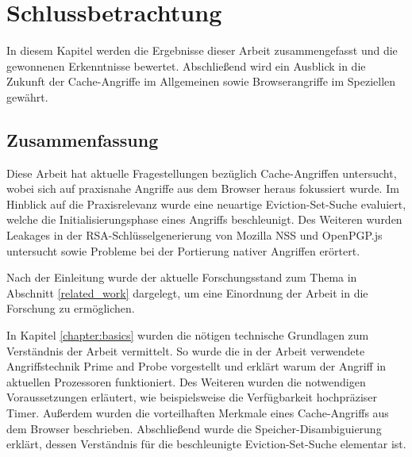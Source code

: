 \chapter{Schlussbetrachtung}
\label{chapter:conclusions}

In diesem Kapitel werden die Ergebnisse dieser Arbeit zusammengefasst und die gewonnenen Erkenntnisse bewertet.
Abschließend wird ein Ausblick in die Zukunft der Cache-Angriffe im Allgemeinen sowie Browserangriffe im Speziellen gewährt.

\section{Zusammenfassung}

Diese Arbeit hat aktuelle Fragestellungen bezüglich Cache-Angriffen untersucht, wobei sich auf praxisnahe Angriffe aus dem Browser heraus fokussiert wurde.
Im Hinblick auf die Praxisrelevanz wurde eine neuartige Eviction-Set-Suche evaluiert, welche die Initialisierungsphase eines Angriffs beschleunigt.
Des Weiteren wurden Leakages in der RSA-Schlüsselgenerierung von Mozilla NSS und OpenPGP.js untersucht sowie Probleme bei der Portierung nativer Angriffen erörtert.

\par \medskip                         

Nach der Einleitung wurde der aktuelle Forschungsstand zum Thema in Abschnitt \ref{related_work} dargelegt, um eine Einordnung der Arbeit in die Forschung zu ermöglichen.

\par \medskip                     

In Kapitel \ref{chapter:basics} wurden die nötigen technische Grundlagen zum Verständnis der Arbeit vermittelt.
So wurde die in der Arbeit verwendete Angriffstechnik Prime and Probe vorgestellt und erklärt warum der Angriff in aktuellen Prozessoren funktioniert.
Des Weiteren wurden die notwendigen Voraussetzungen erläutert, wie beispielsweise die Verfügbarkeit hochpräziser Timer.
Außerdem wurden die vorteilhaften Merkmale eines Cache-Angriffs aus dem Browser beschrieben.
Abschließend wurde die Speicher-Disambiguierung erklärt, dessen Verständnis für die beschleunigte Eviction-Set-Suche elementar ist.

\par \medskip                     

